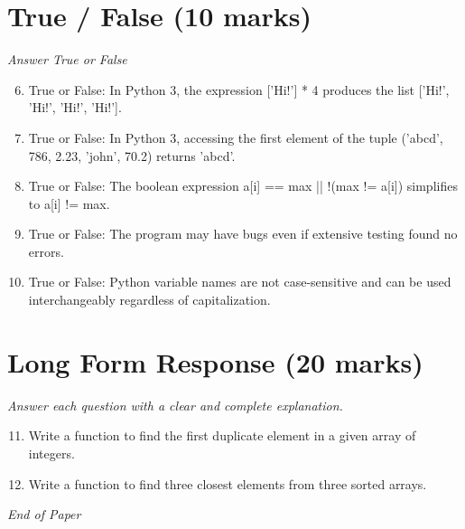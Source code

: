 \documentclass[12pt]{article}
\begin{document}
\section*{True / False (10 marks)}
\textit{Answer True or False}
\begin{enumerate}[label=\arabic*.]
\setcounter{enumi}{5}
\item True or False: In Python 3, the expression ['Hi!'] * 4 produces the list ['Hi!', 'Hi!', 'Hi!', 'Hi!'].
\item True or False: In Python 3, accessing the first element of the tuple ('abcd', 786, 2.23, 'john', 70.2) returns 'abcd'.
\item True or False: The boolean expression a[i] == max || !(max != a[i]) simplifies to a[i] != max.
\item True or False: The program may have bugs even if extensive testing found no errors.
\item True or False: Python variable names are not case-sensitive and can be used interchangeably regardless of capitalization.
\end{enumerate}

\section*{Long Form Response (20 marks)}
\textit{Answer each question with a clear and complete explanation.}
\begin{enumerate}[label=\arabic*.]
\setcounter{enumi}{10}
\item Write a function to find the first duplicate element in a given array of integers.
\item Write a function to find three closest elements from three sorted arrays.
\end{enumerate}

\vfill
\noindent\textit{End of Paper}
\end{document}
